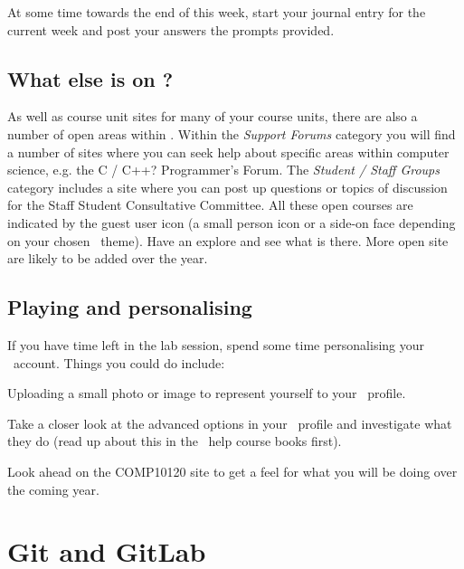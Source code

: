 At some time towards the end of this week, start your journal entry for the current week and post your answers the prompts provided.

\subsection{What else is on \moodle?}
\label{sec:what-else-moodle}


As well as course unit sites for many of your course units, there are also a number of open areas within \moodle. Within the \emph{Support Forums} category you will find a number of sites where you can seek help about specific areas within computer science, e.g. the C / C++? Programmer's Forum. The \emph{Student / Staff Groups} category includes a site where you can post up questions or topics of discussion for the Staff Student Consultative Committee. All these open courses are indicated by the guest user icon (a small person icon or a side-on face depending on your chosen \moodle\ theme). Have an explore and see what is there. More open site are likely to be added over the year.

\subsection*{Playing and personalising}
\label{sec:play-pers}


If you have time left in the lab session, spend some time personalising your \moodle\ account. Things you could do include:

Uploading a small photo or image to represent yourself to your \moodle\ profile.


Take a closer look at the advanced options in your \moodle\ profile and investigate what they do (read up about this in the \moodle\ help course books first).


 Look ahead on the COMP10120 site to get a feel for what you will be doing over the coming year.



\section{Git and GitLab}

